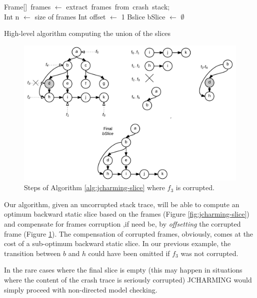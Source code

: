 \documentclass[12pt]{report}
\begin{document}
\begin{algorithm}
 Frame[]~frames $\leftarrow$ extract~frames~from~crash~stack; \\
 Int n $\leftarrow$ size of frames\;
 Int offset $\leftarrow$ 1\;
 Bslice bSlice $\leftarrow$ $\emptyset$\;
\caption{High-level algorithm computing the union of the slices\label{alg:jcharming-slice}}
\end{algorithm}

\begin{figure}
  \centering
    \includegraphics[scale=.20]{media/chap8/algo.png}
    \caption{Steps of Algorithm \ref{alg:jcharming-slice} where $f_3$ is corrupted.
    \label{fig:jcharming-algo}}
\end{figure}

Our algorithm, given an uncorrupted stack trace, will be able to compute
an optimum backward static slice based on the frames (Figure
\ref{fig:jcharming-slice}) and compensate for frames corruption ,if need
be, by \textit{offsetting} the corrupted frame (Figure
\ref{fig:jcharming-algo}). The compensation of corrupted frames,
obviously, comes at the cost of a sub-optimum backward static slice. In
our previous example, the transition between \(b\) and \(h\) could have
been omitted if \(f_3\) was not corrupted.

In the rare cases where the final slice is empty (this may happen in
situations where the content of the crash trace is seriously corrupted)
JCHARMING would simply proceed with non-directed model checking.
\end{document}
